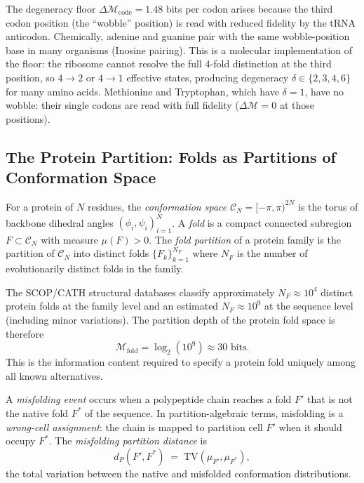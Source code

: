 \begin{remark}
\label{rem:ch02-wobble}
The degeneracy floor $\Delta\mathcal{M}_{\mathrm{code}} = 1.48$ bits per codon
arises because the third codon position (the ``wobble'' position) is read with
reduced fidelity by the tRNA anticodon.  Chemically, adenine and guanine pair
with the same wobble-position base in many organisms (Inosine pairing).  This
is a molecular implementation of the floor: the ribosome cannot resolve the
full 4-fold distinction at the third position, so $4 \to 2$ or $4 \to 1$
effective states, producing degeneracy $\delta \in \{2, 3, 4, 6\}$ for many
amino acids.  Methionine and Tryptophan, which have $\delta = 1$, have no
wobble: their single codons are read with full fidelity ($\Delta\mathcal{M} = 0$
at those positions).
\end{remark}

\subsection{The Protein Partition: Folds as Partitions of Conformation Space}

\begin{definition}
\label{def:ch02-conformation-partition}
For a protein of $N$ residues, the \emph{conformation space}
$\mathcal{C}_N = [-\pi, \pi)^{2N}$ is the torus of backbone dihedral angles
$(\phi_i, \psi_i)_{i=1}^N$.  A \emph{fold} is a compact connected subregion
$F \subset \mathcal{C}_N$ with measure $\mu(F) > 0$.  The \emph{fold partition}
of a protein family is the partition of $\mathcal{C}_N$ into distinct folds
$\{F_k\}_{k=1}^{N_F}$ where $N_F$ is the number of evolutionarily distinct
folds in the family.
\end{definition}

\begin{remark}
\label{rem:ch02-fold-count}
The SCOP/CATH structural databases classify approximately $N_F \approx 10^4$
distinct protein folds at the family level and an estimated $N_F \approx 10^9$
at the sequence level (including minor variations).  The partition depth of
the protein fold space is therefore
\[
  \mathcal{M}_{\mathrm{fold}} = \log_2(10^9) \approx 30 \text{ bits.}
\]
This is the information content required to specify a protein fold uniquely
among all known alternatives.
\end{remark}

\begin{definition}
\label{def:ch02-misfolding}
A \emph{misfolding event} occurs when a polypeptide chain reaches a fold $F'$
that is not the native fold $F^*$ of the sequence.  In partition-algebraic terms,
misfolding is a \emph{wrong-cell assignment}: the chain is mapped to partition
cell $F'$ when it should occupy $F^*$.  The \emph{misfolding partition distance}
is
\[
  d_P(F', F^*)
  \;=\;
  \mathrm{TV}(\mu_{F'}, \mu_{F^*}),
\]
the total variation between the native and misfolded conformation distributions.
\end{definition}


